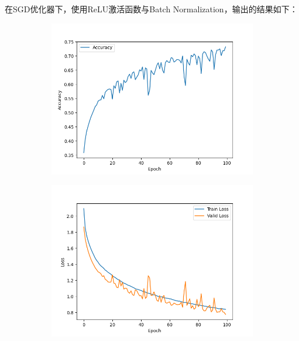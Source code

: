 \documentclass[11pt, a4paper]{article}
\begin{document}
\section{}
在SGD优化器下，使用ReLU激活函数与Batch Normalization，输出的结果如下：
\begin{figure}[H]
    \hfill
    \begin{subfigure}[t]{0.45\linewidth}
        \includegraphics[width=\textwidth]{img/Q2/Acc.png}
    \end{subfigure}
    \hfill
    \begin{subfigure}[t]{0.45\linewidth}
        \includegraphics[width=\textwidth]{img/Q2/Loss.png}
    \end{subfigure}
    \hfill
\end{figure}
\end{document}
